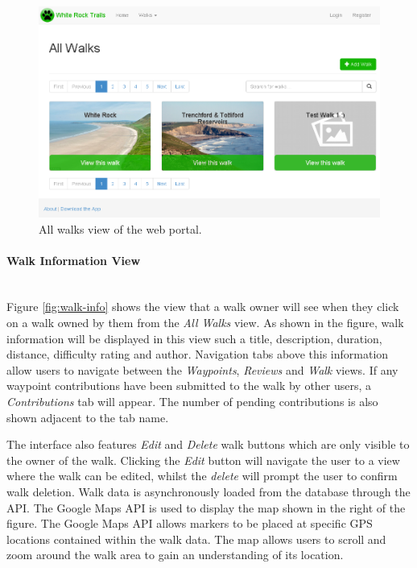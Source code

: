 \documentclass[11pt,a4paper]{report}
\begin{document}
\begin{figure}[H]

\centering

\includegraphics[width=1\linewidth]{./img/webportal/all-walks}

\caption{All walks view of the web portal.}

\label{fig:all-walks}

\end{figure}

\paragraph{Walk Information View}\mbox{}\\
Figure \ref{fig:walk-info} shows the view that a walk owner will see when they click on a walk owned by them from the \emph{All Walks} view. As shown in the figure, walk information will be displayed in this view such a title, description, duration, distance, difficulty rating and author. Navigation tabs above this information allow users to navigate between the \emph{Waypoints}, \emph{Reviews} and \emph{Walk} views. If any waypoint contributions have been submitted to the walk by other users, a \emph{Contributions} tab will appear. The number of pending contributions is also shown adjacent to the tab name. 

The interface also features \emph{Edit} and \emph{Delete} walk buttons which are only visible to the owner of the walk. Clicking the \emph{Edit} button will navigate the user to a view where the walk can be edited, whilst the \emph{delete} will prompt the user to confirm walk deletion. Walk data is asynchronously loaded from the database through the API. The Google Maps API is used to display the map shown in the right of the figure. The Google Maps API allows markers to be placed at specific GPS locations contained within the walk data. The map allows users to scroll and zoom around the walk area to gain an understanding of its location.
\end{document}
